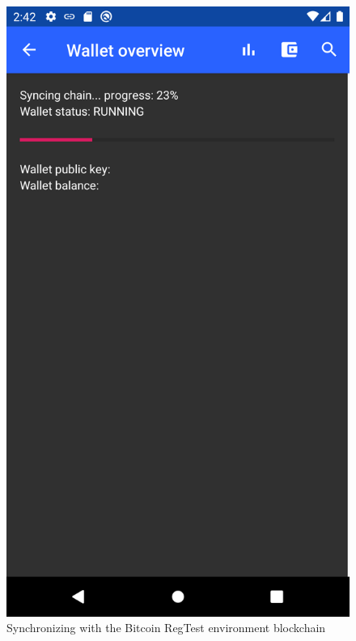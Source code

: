 \begin{figure}
        \includegraphics[width=1\linewidth]{implementation/wallet-sync.png}
        \caption{Synchronizing with the Bitcoin RegTest environment blockchain}
        \label{fig:wallet-sync}
    \endminipage\hfill

\end{figure}
